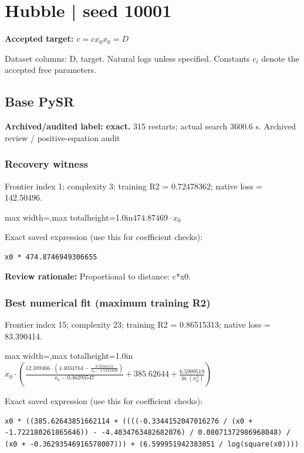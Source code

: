 \documentclass[10pt,letterpaper,landscape]{article}
\begin{document}
\section*{Hubble | seed 10001}
\textbf{Accepted target:} $\displaystyle v=c x_0$\hfill $x_0=D$\par
{\small Dataset columns: D, target. Natural logs unless specified. Constants $c_i$ denote the accepted free parameters.}\par\medskip
\begin{minipage}[t]{0.485\textwidth}
\subsection*{Base PySR}
\textbf{Archived/audited label: exact.} 315 restarts; actual search 3600.6 s.
{\small Archived review / positive-equation audit}
\subsubsection*{Recovery witness}
Frontier index 1; complexity 3; training R2 = 0.72478362; native loss = 142.50496.
\begin{center}\begin{adjustbox}{max width=\linewidth,max totalheight=1.0in}$\displaystyle 474.87469 \cdot x_{0}$\end{adjustbox}\end{center}
{\scriptsize Exact saved expression (use this for coefficient checks):}
\begin{lstlisting}
x0 * 474.8746949306655
\end{lstlisting}
{\small\textbf{Review rationale:} Proportional to distance: c*x0.}
\subsubsection*{Best numerical fit (maximum training R2)}
Frontier index 15; complexity 23; training R2 = 0.86515313; native loss = 83.390414.
\begin{center}\begin{adjustbox}{max width=\linewidth,max totalheight=1.0in}$\displaystyle x_{0} \cdot \left(\frac{12.389466 \cdot \left(4.4034764 - \frac{0.3344152}{x_{0} - 1.7221803}\right)}{x_{0} - 0.36293547} + 385.62644 + \frac{6.5999519}{\ln{\left(x_{0}^{2} \right)}}\right)$\end{adjustbox}\end{center}
{\scriptsize Exact saved expression (use this for coefficient checks):}
\begin{lstlisting}
x0 * ((385.62643851662114 + ((((-0.3344152047016276 / (x0 + -1.722180261865646)) - -4.4034763482682076) / 0.08071372986968048) / (x0 + -0.36293546916578007))) + (6.599951942383051 / log(square(x0))))
\end{lstlisting}
\end{minipage}\hfill
\end{document}
